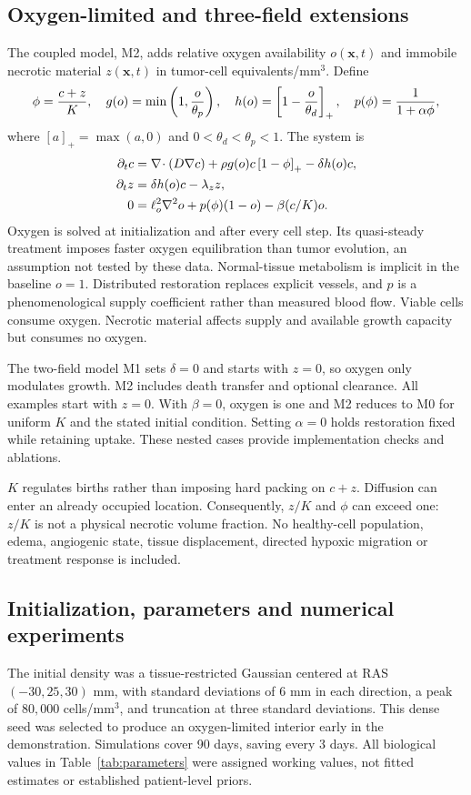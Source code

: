 \subsection{Oxygen-limited and three-field extensions}
The coupled model, M2, adds relative oxygen availability $o(\bm{x},t)$ and immobile necrotic material $z(\bm{x},t)$ in tumor-cell equivalents/mm$^3$. Define
\begin{equation}
 \phi=\frac{c+z}{K},\quad g(o)=\min\left(1,\frac{o}{\theta_p}\right),\quad h(o)=\left[1-\frac{o}{\theta_d}\right]_{+},\quad p(\phi)=\frac{1}{1+\alpha\phi},\label{eq:closures}
\end{equation}
where $[a]_+=\max(a,0)$ and $0<\theta_d<\theta_p<1$. The system is
\begin{align}
 \partial_t c&=\nabla\!\cdot(D\nabla c)+\rho g(o)c\left[1-\phi\right]_{+}-\delta h(o)c,\label{eq:viable}\\
 \partial_t z&=\delta h(o)c-\lambda_z z,\label{eq:dead}\\
 0&=\ell_o^2\nabla^2o+p(\phi)(1-o)-\beta(c/K)o.\label{eq:oxygen}
\end{align}
Oxygen is solved at initialization and after every cell step. Its quasi-steady treatment imposes faster oxygen equilibration than tumor evolution, an assumption not tested by these data. Normal-tissue metabolism is implicit in the baseline $o=1$. Distributed restoration replaces explicit vessels, and $p$ is a phenomenological supply coefficient rather than measured blood flow. Viable cells consume oxygen. Necrotic material affects supply and available growth capacity but consumes no oxygen.

The two-field model M1 sets $\delta=0$ and starts with $z=0$, so oxygen only modulates growth. M2 includes death transfer and optional clearance. All examples start with $z=0$. With $\beta=0$, oxygen is one and M2 reduces to M0 for uniform $K$ and the stated initial condition. Setting $\alpha=0$ holds restoration fixed while retaining uptake. These nested cases provide implementation checks and ablations.

$K$ regulates births rather than imposing hard packing on $c+z$. Diffusion can enter an already occupied location. Consequently, $z/K$ and $\phi$ can exceed one: $z/K$ is not a physical necrotic volume fraction. No healthy-cell population, edema, angiogenic state, tissue displacement, directed hypoxic migration or treatment response is included.

\subsection{Initialization, parameters and numerical experiments}
The initial density was a tissue-restricted Gaussian centered at RAS $(-30,25,30)$ mm, with standard deviations of 6 mm in each direction, a peak of $80{,}000$ cells/mm$^3$, and truncation at three standard deviations. This dense seed was selected to produce an oxygen-limited interior early in the demonstration. Simulations cover 90 days, saving every 3 days. All biological values in Table~\ref{tab:parameters} were assigned working values, not fitted estimates or established patient-level priors.

